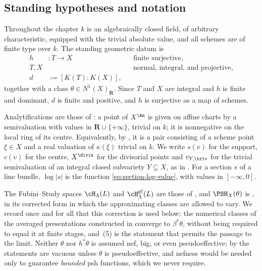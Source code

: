 \subsection{Standing hypotheses and notation}
\label{sec:ch41-hypotheses}

Throughout the chapter $k$ is an algebraically closed field, of arbitrary
characteristic, equipped with the trivial absolute value, and all schemes
are of finite type over $k$.  The standing geometric datum is
\[
 \begin{aligned}
  h&:T\longrightarrow X &&\text{finite surjective},\\
  T,X& &&\text{normal, integral, and projective},\\
  d&:=[K(T):K(X)],
 \end{aligned}
\tag{41.2}\label{eq:ch41-standing}
\]
together with a class $\theta\in N^1(X)_{\mathbf R}$.  Since $T$ and
$X$ are integral and $h$ is finite and dominant, $d$ is finite and
positive, and $h$ is surjective as a map of schemes.

Analytifications are those of : a point of
$X^{\An}$ is given on affine charts by a semivaluation with values
in $\mathbf R\cup\{+\infty\}$, trivial on $k$; it is nonnegative on
the local ring of its centre.
Equivalently, by , it is a pair consisting of a scheme
point $\xi\in X$ and a real valuation of $\kappa(\xi)$ trivial on $k$.
We write $s(v)$ for the support, $c(v)$ for the centre,
$X^{\divis}$ for the divisorial points and $v_{Y,\triv}$ for the trivial
semivaluation of an integral closed subvariety $Y\subseteq X$, as in
.  For a section $s$ of a line bundle,
$\log|s|$ is the function \eqref{eq:section-log-value}, with values in
$[-\infty,0]$.

The Fubini--Study spaces $\cH_\Lambda(L)$ and
$\cH^{\mathrm{gf}}_\Lambda(L)$ are those of
, and $\PSH_X(\theta)$ is
, in its corrected form in which the approximating
classes are allowed to vary.  We record once and for all that this
correction is used below: the numerical classes of the averaged presentations
constructed in  converge to
$\beta^*\theta$, without being required to equal it at finite stages, and
\,(5) is the statement that permits the passage
to the limit.  Neither $\theta$ nor $h^*\theta$ is assumed nef, big, or
even pseudoeffective; by  the statements are
vacuous unless $\theta$ is pseudoeffective, and nefness would be needed
only to guarantee \emph{bounded} psh functions, which we never require.

